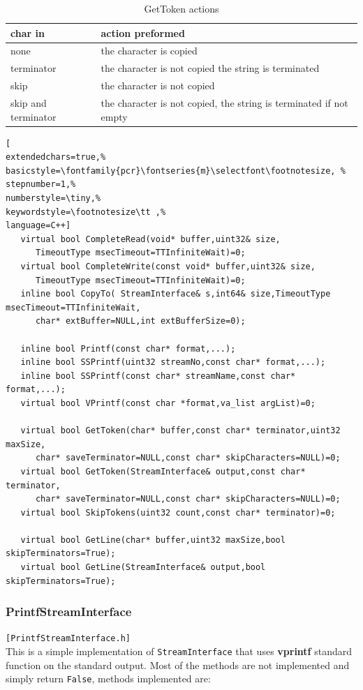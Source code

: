 \begin{table}[!h]
 \begin{center}
  \begin{tabular}{|l|l|}
   \hline
    \textbf{char in} & \textbf{action preformed} \\
   \hline
    none & the character is copied \\
    terminator & the character is not copied the string is terminated \\
    skip & the character is not copied \\
    skip and terminator & the character is not copied, the string is terminated if not empty \\
   \hline
   \end{tabular}
   \end{center}
  \caption{GetToken actions}
 \label{t:gettoken}
\end{table}

\begin{lstlisting}[
extendedchars=true,%
basicstyle=\fontfamily{pcr}\fontseries{m}\selectfont\footnotesize, %
stepnumber=1,%
numberstyle=\tiny,%
keywordstyle=\footnotesize\tt ,%
language=C++]
   virtual bool CompleteRead(void* buffer,uint32& size,
      TimeoutType msecTimeout=TTInfiniteWait)=0;
   virtual bool CompleteWrite(const void* buffer,uint32& size,
      TimeoutType msecTimeout=TTInfiniteWait)=0;
   inline bool CopyTo( StreamInterface& s,int64& size,TimeoutType msecTimeout=TTInfiniteWait,
      char* extBuffer=NULL,int extBufferSize=0);

   inline bool Printf(const char* format,...);
   inline bool SSPrintf(uint32 streamNo,const char* format,...);
   inline bool SSPrintf(const char* streamName,const char* format,...);
   virtual bool VPrintf(const char *format,va_list argList)=0;

   virtual bool GetToken(char* buffer,const char* terminator,uint32 maxSize,
      char* saveTerminator=NULL,const char* skipCharacters=NULL)=0;
   virtual bool GetToken(StreamInterface& output,const char* terminator,
      char* saveTerminator=NULL,const char* skipCharacters=NULL)=0;
   virtual bool SkipTokens(uint32 count,const char* terminator)=0;

   virtual bool GetLine(char* buffer,uint32 maxSize,bool skipTerminators=True);
   virtual bool GetLine(StreamInterface& output,bool skipTerminators=True);
\end{lstlisting}



\subsubsection{PrintfStreamInterface}
\texttt{[PrintfStreamInterface.h]}\\
This is a simple implementation of \texttt{StreamInterface} that uses \textbf{vprintf} standard function on the standard output. Most of the methods are not implemented and simply return \texttt{False}, methods implemented are:

